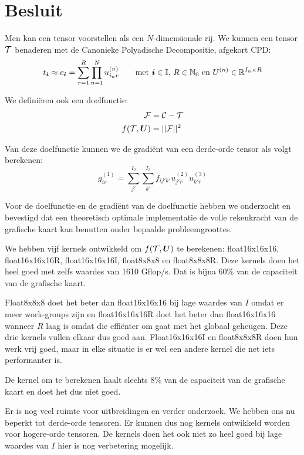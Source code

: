 \chapter{Besluit}
\label{besluit}
Men kan een tensor voorstellen als een $N$-dimensionale rij. We kunnen een tensor $\mathcal{T}$ benaderen met de Canonieke Polyadische Decompositie, afgekort CPD: 
\[
    t_{\boldsymbol{i}{}} \approx c_{\boldsymbol{i}{}} = \sum_{r=1}^{R} \prod_{n=1}^{N} u^{(n)}_{i_{n}r} \qquad
    \text{met $\boldsymbol{i}{} \in \mathbb{I}$, $R \in \mathbb{N}_0$ en $U^{(n)} \in \mathbb{R}^{I_n \times R} $}
\]

We defini\"eren ook een doelfunctie:
\begin{align*}
    \mathcal{F} &= \mathcal{C} - \mathcal{T}\\
    f(\mathcal{T}, \boldsymbol{U}) &= ||\mathcal{F}||^2
\end{align*}

Van deze doelfunctie kunnen we de gradi\"ent van een derde-orde tensor als volgt berekenen:
\[
    g^{(1)}_{ir} =\sum_{j'}^{I_2}\sum_{k'}^{I_3} f_{ij'k'} u^{(2)}_{j'r} u^{(3)}_{k'r}
\]

Voor de doelfunctie en de gradi\"ent van de doelfunctie hebben we onderzocht en bevestigd dat een theoretisch optimale implementatie de volle rekenkracht van de grafische kaart kan benutten onder bepaalde probleemgroottes.

We hebben vijf kernels ontwikkeld om $f(\mathcal{T}, \boldsymbol{U})$ te berekenen: float16x16x16, float16x16x16R, float16x16x16I, float8x8x8 en float8x8x8R. Deze kernels doen het heel goed met zelfs waardes van 1610 Gflop/s. Dat is bijna 60\% van de capaciteit van de grafische kaart.

Float8x8x8 doet het beter dan float16x16x16 bij lage waardes van $I$ omdat er meer work-groups zijn en float16x16x16R doet het beter dan float16x16x16 wanneer $R$ laag is omdat die effi\"enter om gaat met het globaal geheugen. Deze drie kernels vullen elkaar dus goed aan. Float16x16x16I en float8x8x8R doen hun werk vrij goed, maar in elke situatie is er wel een andere kernel die net iets performanter is.

De kernel om \GGG{} te berekenen haalt slechts 8\% van de capaciteit van de grafische kaart en doet het dus niet goed.


Er is nog veel ruimte voor uitbreidingen en verder onderzoek. We hebben ons nu beperkt tot derde-orde tensoren. Er kunnen dus nog kernels ontwikkeld worden voor hogere-orde tensoren. De kernels doen het ook niet zo heel goed bij lage waardes van $I$ hier is nog verbetering mogelijk.

